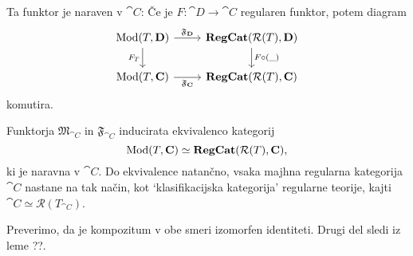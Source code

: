 \documentclass[../kategoricna_logika.tex]{subfiles}
\begin{document}
Ta funktor je naraven v $\cat{C}$: Če je $F : \cat{D} \to \cat{C}$ regularen funktor, potem diagram
\begin{equation}
  \begin{tikzcd}
    \Mod(T, \cat{D}) \ar[d, "F_T"'] \ar[r, "\mathfrak{F}_{\cat{D}}"] & \cat{RegCat}(\mathcal{R}(T), \cat{D}) \ar[d, "F \circ (\_)"] \\
    \Mod(T, \cat{C}) \ar[r, "\mathfrak{F}_{\cat{C}}"'] & \cat{RegCat}(\mathcal{R}(T), \cat{C})
  \end{tikzcd}
\end{equation}
komutira.
\begin{izrek}
  Funktorja $\mathfrak{M}_{\cat{C}}$ in $\mathfrak{F}_{\cat{C}}$ inducirata ekvivalenco kategorij
  $$\operatorname{Mod}(T, {\operatorname{\mathbf{C}}}) \simeq {\operatorname{\mathbf{RegCat}}}(\mathcal{R}(T), {\operatorname{\mathbf{C}}}),$$
  ki je naravna v $\cat{C}$. Do ekvivalence natančno, vsaka majhna regularna kategorija $\cat{C}$ nastane na tak način, kot `klasifikacijska kategorija' regularne teorije, kajti $\cat{C} \simeq \mathcal{R}(T_{\cat{C}})$.
\end{izrek}
\begin{dokaz}
  Preverimo, da je kompozitum v obe smeri izomorfen identiteti. Drugi del sledi iz leme ??.
\end{dokaz}
\end{document}
